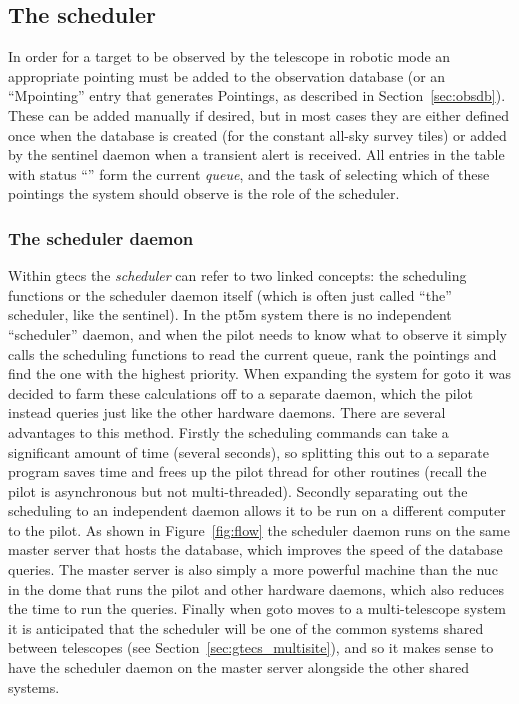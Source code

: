 \begin{colsection}
\begin{colsection}
\end{colsection}


\subsection{The scheduler}
\label{sec:scheduler}
\begin{colsection}

In order for a target to be observed by the telescope in robotic mode an appropriate pointing must be added to the observation database (or an ``Mpointing'' entry that generates Pointings, as described in Section~\ref{sec:obsdb}). These can be added manually if desired, but in most cases they are either defined once when the database is created (for the constant all-sky survey tiles) or added by the sentinel daemon when a transient alert is received. All entries in the  table with status ``'' form the current \textit{queue}, and the task of selecting which of these pointings the system should observe is the role of the scheduler.

\subsubsection{The scheduler daemon}

Within \gls{gtecs} the \textit{scheduler} can refer to two linked concepts: the scheduling functions or the scheduler daemon itself (which is often just called ``the'' scheduler, like the sentinel). In the \gls{pt5m} system there is no independent ``scheduler'' daemon, and when the pilot needs to know what to observe it simply calls the scheduling functions to read the current queue, rank the pointings and find the one with the highest priority. When expanding the system for \gls{goto} it was decided to farm these calculations off to a separate daemon, which the pilot instead queries just like the other hardware daemons. There are several advantages to this method. Firstly the scheduling commands can take a significant amount of time (several seconds), so splitting this out to a separate program saves time and frees up the pilot thread for other routines (recall the pilot is asynchronous but not multi-threaded). Secondly separating out the scheduling to an independent daemon allows it to be run on a different computer to the pilot. As shown in Figure~\ref{fig:flow} the scheduler daemon runs on the same master server that hosts the database, which improves the speed of the database queries. The master server is also simply a more powerful machine than the \gls{nuc} in the dome that runs the pilot and other hardware daemons, which also reduces the time to run the queries. Finally when \gls{goto} moves to a multi-telescope system it is anticipated that the scheduler will be one of the common systems shared between telescopes (see Section~\ref{sec:gtecs_multisite}), and so it makes sense to have the scheduler daemon on the master server alongside the other shared systems.


\end{colsection}
\end{colsection}

